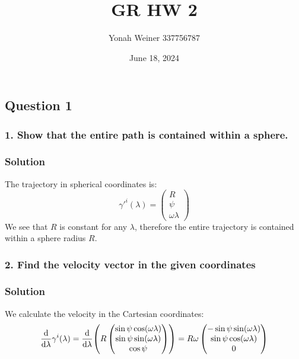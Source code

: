 \documentclass{article}
\title{GR HW 2}
\author{Yonah Weiner 337756787}
\date{June 18, 2024}
\begin{document}
\maketitle

\subsection*{Question 1}
\subsubsection*{1. Show that the entire path is contained within a sphere.}
\subsubsection*{Solution}
The trajectory in spherical coordinates is: 
\begin{equation}
        \gamma'^i(\lambda) =  \begin{pmatrix}
            R\\
            \psi\\
            \omega \lambda
        \end{pmatrix}
\end{equation}
We see that $R$ is constant for any $\lambda$, therefore the entire trajectory is contained within a sphere radius $R$.
\subsubsection*{2. Find the velocity vector in the given coordinates}
\subsubsection*{Solution}
We calculate the velocity in the Cartesian coordinates:
\begin{equation}
        \dv{\lambda}\gamma^i(\lambda) = \dv{\lambda}( R\begin{pmatrix}
            \sin \psi \cos (\omega\lambda)\\
            \sin \psi \sin (\omega\lambda)\\
            \cos \psi 
        \end{pmatrix})= R\omega\begin{pmatrix}
           -\sin \psi \sin (\omega\lambda)\\
           \sin \psi \cos (\omega\lambda)\\
            0
        \end{pmatrix}
\end{equation}
\end{document}
